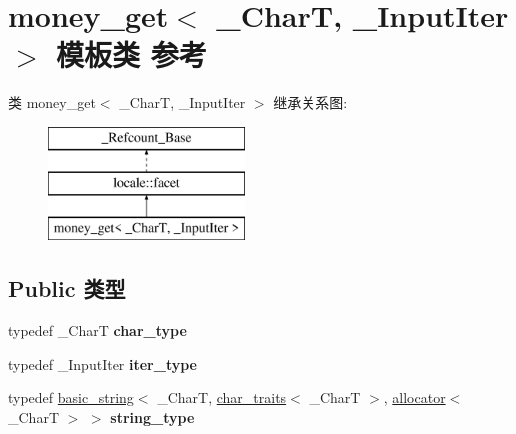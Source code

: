 \hypertarget{classmoney__get}{}\section{money\+\_\+get$<$ \+\_\+\+CharT, \+\_\+\+Input\+Iter $>$ 模板类 参考}
\label{classmoney__get}
类 money\+\_\+get$<$ \+\_\+\+CharT, \+\_\+\+Input\+Iter $>$ 继承关系图\+:\begin{figure}[H]
\begin{center}
\leavevmode
\includegraphics[height=3.000000cm]{classmoney__get}
\end{center}
\end{figure}
\subsection*{Public 类型}
\begin{DoxyCompactItemize}
\item 
\mbox{\label{classmoney__get_acb148ec21c6e06f8468f0b97afe3d7b2}} 
typedef \+\_\+\+CharT {\bfseries char\+\_\+type}
\item 
\mbox{\label{classmoney__get_a0fde7c3d0a5dd8e74359ef331e65902b}} 
typedef \+\_\+\+Input\+Iter {\bfseries iter\+\_\+type}
\item 
\mbox{\label{classmoney__get_a058b30f3462411f6569216e70552dd70}} 
typedef \hyperlink{classbasic__string}{basic\+\_\+string}$<$ \+\_\+\+CharT, \hyperlink{classchar__traits}{char\+\_\+traits}$<$ \+\_\+\+CharT $>$, \hyperlink{classallocator}{allocator}$<$ \+\_\+\+CharT $>$ $>$ {\bfseries string\+\_\+type}
\end{DoxyCompactItemize}
